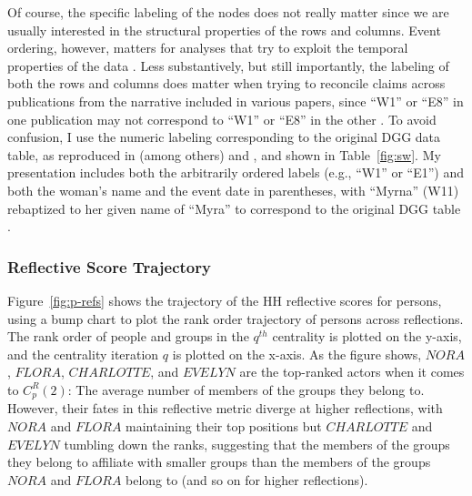 \documentclass[a4paper,fleqn]{cas-sc}
\begin{document}
Of course, the specific labeling of the nodes does not really matter since we are usually interested in the structural properties of the rows and columns. Event ordering, however, matters for analyses that try to exploit the temporal properties of the data \citep[e.g.,][]{everett2018measuring, lerner2022dynamic}. Less substantively, but still importantly, the labeling of both the rows and columns does matter when trying to reconcile claims across publications from the narrative included in various papers, since ``W1'' or ``E8'' in one publication \citep[e.g.,][]{freeman2003finding} may not correspond to ``W1'' or ``E8'' in the other \citep[e.g.,][]{doreian1979evolution}. To avoid confusion, I use the numeric labeling corresponding to the original DGG data table, as reproduced in (among others) \citet[Figure 1]{freeman2003finding} and \citet[Figure 28.1]{borgatti2014analyzing}, and shown in Table~\ref{fig:sw}. My presentation includes both the arbitrarily ordered labels (e.g., ``W1'' or ``E1'') and both the woman's name and the event date in parentheses, with ``Myrna'' (W11) rebaptized to her given name of ``Myra'' to correspond to the original DGG table \citep{freeman2003finding, batagelj2022analysis}.

\subsubsection{Reflective Score Trajectory}
Figure~\ref{fig:p-refs} shows the trajectory of the HH reflective scores for persons, using a bump chart to plot the rank order trajectory of persons across reflections. The rank order of people and groups in the $q^{th}$ centrality is plotted on the y-axis, and the centrality iteration $q$ is plotted on the x-axis. As the figure shows, $NORA$, $FLORA$, $CHARLOTTE$, and $EVELYN$ are the top-ranked actors when it comes to $C^R_p(2)$:  The average number of members of the groups they belong to. However, their fates in this reflective metric diverge at higher reflections, with $NORA$ and $FLORA$ maintaining their top positions but $CHARLOTTE$ and $EVELYN$ tumbling down the ranks, suggesting that the members of the groups they belong to affiliate with smaller groups than the members of the groups $NORA$ and $FLORA$ belong to (and so on for higher reflections). 
\end{document}
